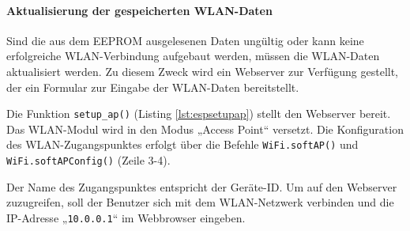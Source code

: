 \documentclass[12pt, letterpaper]{article}
\begin{document}
  \paragraph{Aktualisierung der gespeicherten WLAN-Daten}
  \par \textbf{}
  \par Sind die aus dem EEPROM ausgelesenen Daten ungültig oder kann keine erfolgreiche WLAN-Verbindung aufgebaut werden, müssen die WLAN-Daten aktualisiert werden. Zu diesem Zweck wird ein Webserver zur Verfügung gestellt, der ein Formular zur Eingabe der WLAN-Daten bereitstellt. 
  \par Die Funktion \texttt{setup\_ap()} (Listing \ref{lst:espsetupap}) stellt den Webserver bereit. Das WLAN-Modul wird in den Modus „Access Point“ versetzt. Die Konfiguration des WLAN-Zugangspunktes erfolgt über die Befehle \texttt{WiFi.softAP()} und \texttt{WiFi.softAPConfig()} (Zeile 3-4). 
  \par Der Name des Zugangspunktes entspricht der Geräte-ID. Um auf den Webserver zuzugreifen, soll der Benutzer sich mit dem WLAN-Netzwerk verbinden und die IP-Adresse „\texttt{10.0.0.1}“ im Webbrowser eingeben.
\end{document}
